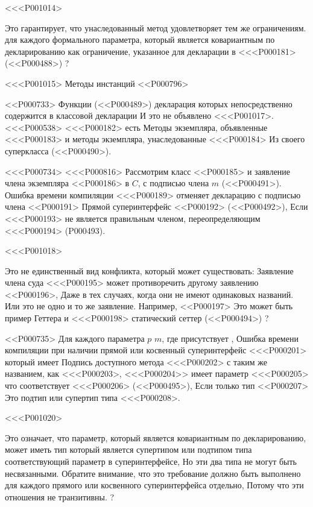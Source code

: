{{{{{{{{{{{{{{{{{{<<<P001014>{%
Это гарантирует, что унаследованный метод удовлетворяет тем же ограничениям.
для каждого формального параметра, который является ковариантным по декларированию
как ограничение, указанное для декларации в <<<P000181>
(<<P000488>) %
?


<<<P001015> Методы инстанций
<<P000796>

<<P000733>%
Функции (<<P000489>)
декларация которых непосредственно содержится в классовой декларации
И это не объявлено <<<P001017>.
<<<P000538> <<<P000182> есть
Методы экземпляра, объявленные <<<P000183>
и методы экземпляра, унаследованные <<<P000184> Из своего суперкласса
(<<P000490>).

<<<P000734>%
<<<P000816>%
Рассмотрим класс <<P000185>
и заявление члена экземпляра <<P000186> в $C$, с подписью члена $m$
(<<P000491>).
Ошибка времени компиляции <<<P000189> отменяет декларацию
с подписью члена <<P000191>
Прямой суперинтерфейс <<P000192>
(<<P000492>),
Если <<<P000193> не является правильным членом, переопределяющим <<<P000194>
(P000493).

<<<P001018>{%
Это не единственный вид конфликта, который может существовать:
Заявление члена суда <<<P000195> может противоречить другому заявлению <<P000196>,
Даже в тех случаях, когда они не имеют одинаковых названий.
Или это не одно и то же заявление.
Например, <<P000197> Это может быть пример Геттера и <<<P000198> статический сеттер
(<<P000494>) %
?

<<P000735>%
Для каждого параметра $p$ $m$, где присутствует \COVARIANT{},
Ошибка времени компиляции при наличии
прямой или косвенный суперинтерфейс <<<P000201> который имеет
Подпись доступного метода <<<P000202> с таким же названием, как <<<P000203>,
<<<P000204>> имеет параметр <<<P000205> что соответствует <<<P000206>
(<<P000495>),
Если только тип <<P000207> Это подтип или супертип типа <<<P000208>.

<<<P001020>{%
Это означает, что
параметр, который является ковариантным по декларированию, может иметь тип
который является супертипом или подтипом типа
соответствующий параметр в суперинтерфейсе,
Но эти два типа не могут быть несвязанными.
Обратите внимание, что это требование должно быть выполнено
для каждого прямого или косвенного суперинтерфейса отдельно,
Потому что эти отношения не транзитивны.
?

}}}}}}}}}}}}}}}}}}}}}
